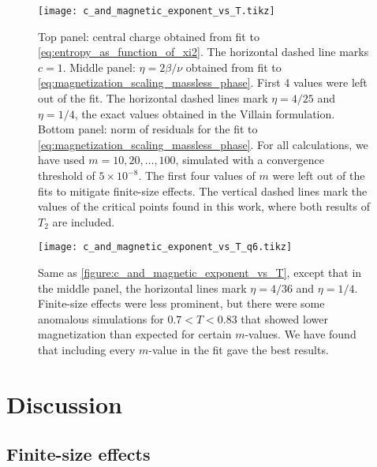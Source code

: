 \begin{figure}
  \centering
  \texttt{[image: c\_and\_magnetic\_exponent\_vs\_T.tikz]}
  \caption{Top panel: central charge obtained from fit to \autoref{eq:entropy_as_function_of_xi2}. The horizontal dashed line marks $c = 1$.
  Middle panel: $\eta = 2 \beta / \nu$ obtained from fit to \autoref{eq:magnetization_scaling_massless_phase}.
  First 4 values were left out of the fit.
  The horizontal dashed lines mark $\eta = 4/25$ and $\eta = 1/4$, the exact values obtained in the Villain formulation.
  Bottom panel: norm of residuals for the fit to \autoref{eq:magnetization_scaling_massless_phase}.
  For all calculations, we have used $m = 10, 20, \dots, 100$, simulated with a convergence threshold of $5 \times
  10^{-8}$. The first four values of $m$ were left out of the fits to mitigate finite-size effects.
  The vertical dashed lines mark the values of the critical points found in this work,
  where both results of $T_2$ are included.
}\label{figure:c_and_magnetic_exponent_vs_T}
\end{figure}

\begin{figure}
  \centering
  \texttt{[image: c\_and\_magnetic\_exponent\_vs\_T\_q6.tikz]}
  \caption{Same as \autoref{figure:c_and_magnetic_exponent_vs_T}, except that in the middle panel,
  the horizontal lines mark $\eta = 4/36$ and $\eta = 1/4$.
  Finite-size effects were less prominent, but there were some anomalous simulations for $0.7 < T < 0.83$ that showed
  lower magnetization than expected for certain $m$-values.
  We have found that including every $m$-value in the fit gave the best results.
}\label{figure:c_and_magnetic_exponent_vs_T_q6}
\end{figure}


\section{Discussion}

\subsection{Finite-size effects}

